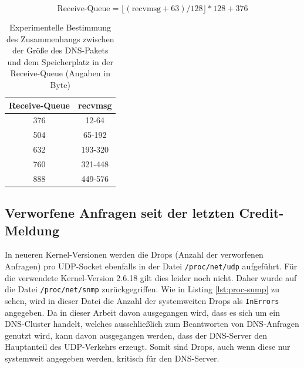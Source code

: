 \documentclass[a4paper, 12pt, BCOR10mm, DIV12, toc=bibliography, toc=listof, german]{scrbook}
\begin{document}
		\begin{equation}
			\text{Receive-Queue} = \lfloor (\text{recvmsg} + 63) / 128 \rfloor * 128 + 376	
			\label{eq:recvmsg}
		\end{equation}

		\begin{table}
			\centering
			\begin{tabular}{|c|c|}\hline
				Receive-Queue & recvmsg \\\hline\hline
				376 & 12-64	\\
				504 & 65-192	\\
				632 & 193-320	\\
				760 & 321-448 \\
				888 &	449-576\\\hline
			\end{tabular}
			\caption{Experimentelle Bestimmung des Zusammenhangs zwischen der Größe des DNS-Pakets und dem
			Speicherplatz in der Receive-Queue (Angaben in Byte)}
			\label{tab:recvmsg}
		\end{table}

		


		\subsection*{Verworfene Anfragen seit der letzten Credit-Meldung} %

		In neueren Kernel-Versionen werden die Drops (Anzahl der verworfenen Anfragen) pro UDP-Socket
		ebenfalls in der Datei \texttt{/proc/net/udp} aufgeführt. Für die verwendete Kernel-Version
		2.6.18 gilt dies leider noch nicht. Daher wurde auf die Datei \texttt{/proc/net/snmp}
		zurückgegriffen. Wie in Listing \ref{lst:proc-snmp} zu sehen, wird in dieser Datei die Anzahl
		der systemweiten Drops als \texttt{InErrors} angegeben. Da in dieser Arbeit davon ausgegangen
		wird, dass es sich um ein DNS-Cluster handelt, welches ausschließlich zum Beantworten von
		DNS-Anfragen genutzt wird, kann davon	ausgegangen werden, dass der DNS-Server den Hauptanteil
		des UDP-Verkehrs erzeugt. Somit sind Drops, auch wenn diese nur systemweit angegeben werden,
		kritisch für den DNS-Server.
		
		
\end{document}
